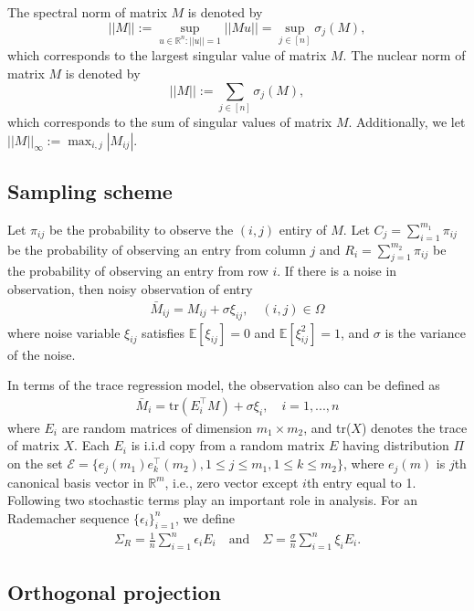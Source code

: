 \documentclass{article} %
\begin{document}
The spectral norm of matrix $M$ is denoted by
\begin{equation}
||M|| := \sup_{u\in \mathbb{R}^n:||u||=1}||Mu|| = \sup_{j\in[n]}\sigma_j(M),
\end{equation}
which corresponds to the largest singular value of matrix $M$. The nuclear norm of matrix $M$ is denoted by
\begin{equation}
||M|| := \sum_{j\in[n]}\sigma_j(M),
\end{equation}
which corresponds to the sum of singular values of matrix $M$. Additionally, we let $||M||_\infty := \max_{i,j}|M_{ij}|$.

\subsection{Sampling scheme}
Let $\pi_{ij}$ be the probability to observe the $(i,j)$ entiry of $M$. Let $C_j = \sum_{i=1}^{m_1} \pi_{ij}$ be the probability of observing an entry from column $j$ and $R_i = \sum_{j=1}^{m_2} \pi_{ij}$ be the probability of observing an entry from row $i$.
If there is a noise in observation, then noisy observation of entry
\begin{align}
\bar{M}_{ij} = M_{ij} + \sigma\xi_{ij}, \quad (i,j) \in \Omega
\end{align}
where noise variable $\xi_{ij}$ satisfies $\mathbb{E}[\xi_{ij}] = 0$ and $\mathbb{E}[\xi_{ij}^2] = 1$, and $\sigma$ is the variance of the noise.

In terms of the trace regression model, the observation also can be defined as
\begin{align}
\bar{M}_{i} = \text{tr}(E_i^\top M) + \sigma\xi_i, \quad i=1,...,n
\end{align}
where $E_i$ are random matrices of dimension $m_1 \times m_2$, and tr($X$) denotes the trace of matrix $X$. Each $E_i$ is i.i.d copy from a random matrix $E$ having distribution $\Pi$ on the set $\mathcal{E} = \{e_j(m_1)e_k^\top(m_2), 1\leq j \leq m_1, 1\leq k \leq m_2 \}$, where $e_j(m)$ is $j$th canonical basis vector in $\mathbb{R}^m$, i.e., zero vector except $i$th entry equal to 1. Following two stochastic terms play an important role in analysis. For an Rademacher sequence $\{\epsilon_i\}_{i=1}^{n}$, we define
\begin{align}
\Sigma_R = \frac{1}{n}\sum_{i=1}^{n}\epsilon_i E_i \quad \text{and} \quad\Sigma = \frac{\sigma}{n}\sum_{i=1}^{n}\xi_i E_i.
\end{align}


\subsection{Orthogonal projection}
\end{document}

